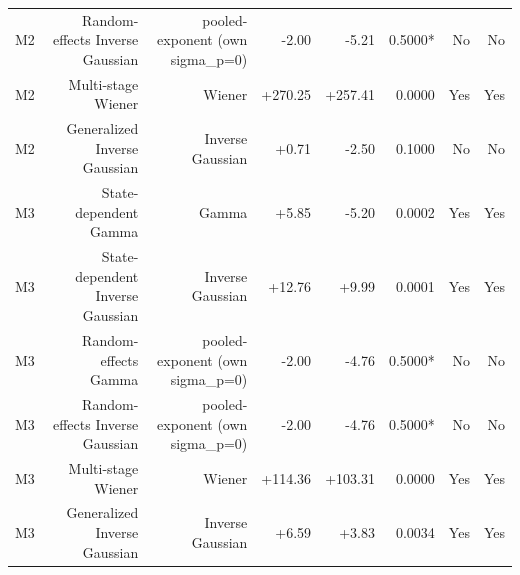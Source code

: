 \begin{table}[t]
\begin{tabular}{lrrrrrrr}
M2 & Random-effects Inverse Gaussian & pooled-exponent (own sigma\_p=0) & -2.00 & -5.21 & 0.5000* & No & No \\
M2 & Multi-stage Wiener & Wiener & +270.25 & +257.41 & 0.0000 & Yes & Yes \\
M2 & Generalized Inverse Gaussian & Inverse Gaussian & +0.71 & -2.50 & 0.1000 & No & No \\
M3 & State-dependent Gamma & Gamma & +5.85 & -5.20 & 0.0002 & Yes & Yes \\
M3 & State-dependent Inverse Gaussian & Inverse Gaussian & +12.76 & +9.99 & 0.0001 & Yes & Yes \\
M3 & Random-effects Gamma & pooled-exponent (own sigma\_p=0) & -2.00 & -4.76 & 0.5000* & No & No \\
M3 & Random-effects Inverse Gaussian & pooled-exponent (own sigma\_p=0) & -2.00 & -4.76 & 0.5000* & No & No \\
M3 & Multi-stage Wiener & Wiener & +114.36 & +103.31 & 0.0000 & Yes & Yes \\
M3 & Generalized Inverse Gaussian & Inverse Gaussian & +6.59 & +3.83 & 0.0034 & Yes & Yes \\
\bottomrule
\end{tabular}
\end{table}
